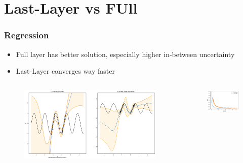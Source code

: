 \documentclass{beamer}
\begin{document}
        \section{Last-Layer vs FUll}
        \begin{frame}
            \frametitle{Regression}
            \begin{itemize}
                \item Full layer has better solution, especially higher in-between uncertainty
                \item Last-Layer converges way faster 
            \end{itemize}
            \begin{columns}
                \begin{column}{0.5\textwidth}
                    \begin{figure}
                        \includegraphics[width=\textwidth]{images/RegressionLLvsFULL.png}
                    \end{figure}
                \end{column}
                \begin{column}{0.5\textwidth}
                    \begin{figure}
                        \includegraphics[width=\textwidth]{images/RegressionLLvsFullEpoch.png}
                    \end{figure}
                \end{column}
            \end{columns}
        \end{frame}
\end{document}
